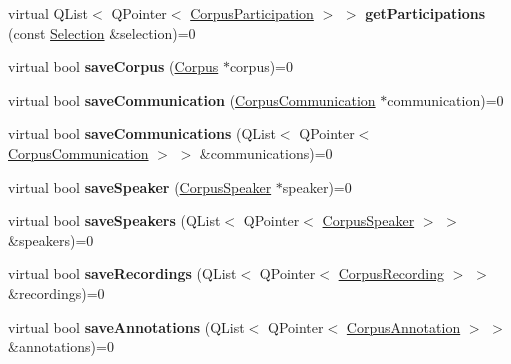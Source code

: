 \begin{DoxyCompactItemize}
virtual Q\+List$<$ Q\+Pointer$<$ \hyperlink{class_corpus_participation}{Corpus\+Participation} $>$ $>$ {\bfseries get\+Participations} (const \hyperlink{class_metadata_datastore_1_1_selection}{Selection} \&selection)=0
\item 
\mbox{\label{class_metadata_datastore_a600c346e4c73aea9265ce15a94ab02e4}} 
virtual bool {\bfseries save\+Corpus} (\hyperlink{class_corpus}{Corpus} $\ast$corpus)=0
\item 
\mbox{\label{class_metadata_datastore_aa95524d706dc25630b261b277ff9c535}} 
virtual bool {\bfseries save\+Communication} (\hyperlink{class_corpus_communication}{Corpus\+Communication} $\ast$communication)=0
\item 
\mbox{\label{class_metadata_datastore_aed1cdaccd34165d3cc9524ef382969d5}} 
virtual bool {\bfseries save\+Communications} (Q\+List$<$ Q\+Pointer$<$ \hyperlink{class_corpus_communication}{Corpus\+Communication} $>$ $>$ \&communications)=0
\item 
\mbox{\label{class_metadata_datastore_ad60bfedab89e149f20a66e973b157d6d}} 
virtual bool {\bfseries save\+Speaker} (\hyperlink{class_corpus_speaker}{Corpus\+Speaker} $\ast$speaker)=0
\item 
\mbox{\label{class_metadata_datastore_a6e5689f98fed0a8f2801ff88775c8621}} 
virtual bool {\bfseries save\+Speakers} (Q\+List$<$ Q\+Pointer$<$ \hyperlink{class_corpus_speaker}{Corpus\+Speaker} $>$ $>$ \&speakers)=0
\item 
\mbox{\label{class_metadata_datastore_a5bfb980af2c6e370c991cdc60152a75f}} 
virtual bool {\bfseries save\+Recordings} (Q\+List$<$ Q\+Pointer$<$ \hyperlink{class_corpus_recording}{Corpus\+Recording} $>$ $>$ \&recordings)=0
\item 
\mbox{\label{class_metadata_datastore_ae964579c99e46bc359be62f51cdddcbc}} 
virtual bool {\bfseries save\+Annotations} (Q\+List$<$ Q\+Pointer$<$ \hyperlink{class_corpus_annotation}{Corpus\+Annotation} $>$ $>$ \&annotations)=0
\item 
\mbox{\label{class_metadata_datastore_a1f36ee900fba3d9b95822a49aa3796ff}} 

\end{DoxyCompactItemize}
